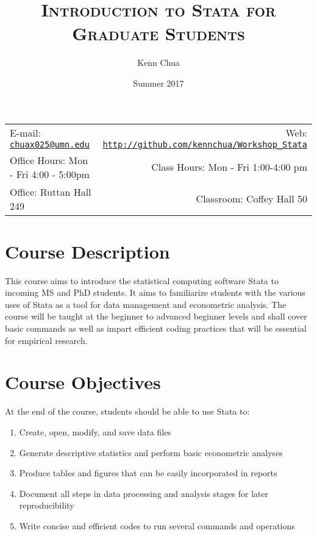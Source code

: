 \documentclass[11pt]{article}
\title{\textsc{Introduction to Stata for Graduate Students}}
\author{Kenn Chua}
\date{Summer 2017}
\newcommand{\blankline}{\quad\pagebreak[2]}
\begin{document}
\maketitle

\blankline

\begin{tabular*}{.93\textwidth}{@{\extracolsep{\fill}}lr}
\hline 

E-mail:  \href{mailto:chuax025@umn.edu}{\nolinkurl{chuax025@umn.edu}} & Web: \href{http://github.com/kennchua/Workshop_Stata}{\nolinkurl{http://github.com/kennchua/Workshop_Stata}}  \\

 Office Hours: Mon - Fri 4:00 - 5:00pm  &  Class Hours: Mon - Fri 1:00-4:00 pm \\

 Office: Ruttan Hall 249 & Classroom: Coffey Hall 50 \\
\hline
\end{tabular*}

\vspace{5 mm}


\section*{Course Description}

This course aims to introduce the statistical computing software Stata to incoming MS and PhD students. It aims to familiarize students with the various uses of Stata as a tool for data management and econometric analysis. The course will be taught at the beginner to advanced beginner levels and shall cover basic commands as well as impart efficient coding practices that will be essential for empirical research.  



\section*{Course Objectives}
At the end of the course, students should be able to use Stata to:
\begin{enumerate}
\item Create, open, modify, and save data files
\item	 Generate descriptive statistics and perform basic econometric analyses
\item Produce tables and figures that can be easily incorporated in reports
\item Document all steps in data processing and analysis stages for later reproducibility     
\item Write concise and efficient codes to run several commands and operations  
\end{enumerate}
\end{document}

